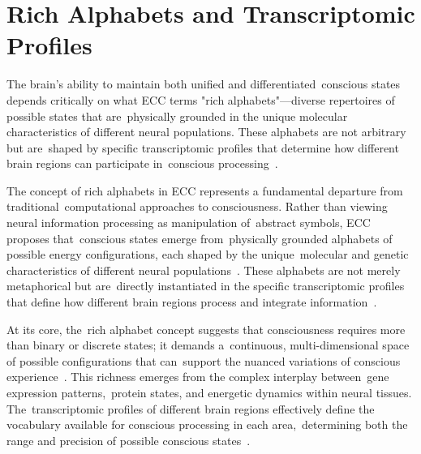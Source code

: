 \section{Rich Alphabets and Transcriptomic Profiles~}

The brain's ability to maintain both unified and differentiated~conscious states depends critically on what ECC terms "rich alphabets"—diverse repertoires of possible states that are~physically grounded in the unique molecular characteristics of different neural populations. These alphabets are not arbitrary but are~shaped by specific transcriptomic profiles that determine how different brain regions can participate in~conscious processing~\cite{siletti2023transcriptomic, bakken2021comparative}.

The concept of rich alphabets in ECC represents a fundamental departure from traditional~computational approaches to consciousness. Rather than viewing neural information processing as manipulation of~abstract symbols, ECC proposes that~conscious states emerge from~physically grounded alphabets of possible energy configurations, each shaped by the unique~molecular and genetic characteristics of different neural populations~\cite{cembrowski2018continuous}. These alphabets are not merely metaphorical but are~directly instantiated in the specific transcriptomic profiles that define how different brain regions process and integrate information~\cite{zhang2023adaptive}.

At its core, the~rich alphabet concept suggests that consciousness requires more than binary or discrete states; it demands a~continuous, multi-dimensional space of possible configurations that can~support the nuanced variations of conscious experience~\cite{breakspear2005dynamics}. This richness emerges from the complex interplay between~gene expression patterns,~protein states, and energetic dynamics within neural tissues. The~transcriptomic profiles of different brain regions effectively define the vocabulary available for conscious processing in each area,~determining both the range and precision of possible conscious states~\cite{siletti2023transcriptomic}.

